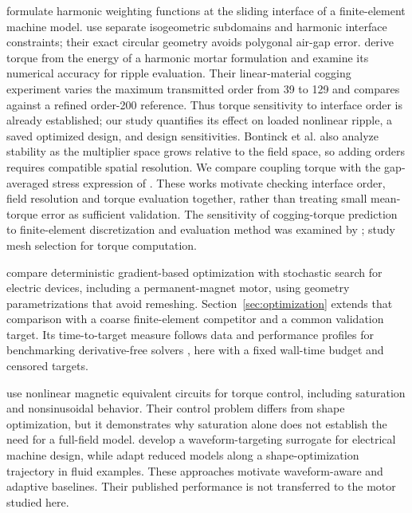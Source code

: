 \documentclass{anvil-paper}
\begin{document}
\citet{degersem2004harmonic} formulate harmonic weighting functions at
the sliding interface of a finite-element machine model.
\citet{bontinck2018isogeometric} use separate isogeometric subdomains and
harmonic interface constraints; their exact circular geometry avoids
polygonal air-gap error. \citet{egger2022torque} derive torque from the
energy of a harmonic mortar formulation and examine its numerical
accuracy for ripple evaluation. Their linear-material cogging experiment
varies the maximum transmitted order from 39 to 129 and compares against
a refined order-200 reference. Thus torque sensitivity to interface order
is already established; our study quantifies its effect on loaded nonlinear
ripple, a saved optimized design, and design sensitivities.
Bontinck et al. also analyze stability as the multiplier space grows
relative to the field space, so adding orders requires compatible spatial
resolution. We compare coupling torque with the
gap-averaged stress expression of \citet{arkkio1987}. These works motivate
checking interface order, field resolution and torque evaluation together,
rather than treating small mean-torque error as sufficient validation.
The sensitivity of cogging-torque prediction to finite-element
discretization and evaluation method was examined by \citet{howe1992cogging};
\citet{arkkio2012proper} study mesh selection for torque computation.

\citet{ion2018robust} compare deterministic gradient-based optimization
with stochastic search for electric devices, including a permanent-magnet
motor, using geometry parametrizations that avoid remeshing.
Section~\ref{sec:optimization} extends that comparison with a coarse
finite-element competitor and a common validation target. Its
time-to-target measure follows data and performance profiles for
benchmarking derivative-free solvers
\citep{more2009benchmarking,dolan2002benchmarking}, here with a fixed
wall-time budget and censored targets.

\citet{kemmetmueller2015} use nonlinear magnetic equivalent circuits for
torque control, including saturation and nonsinusoidal behavior. Their
control problem differs from shape optimization, but it demonstrates why
saturation alone does not establish the need for a full-field model.
\citet{roomi2022} develop a waveform-targeting surrogate for electrical
machine design, while \citet{wen2023} adapt reduced models along a
shape-optimization trajectory in fluid examples. These approaches motivate
waveform-aware and adaptive baselines. Their published performance is not
transferred to the motor studied here.
\end{document}

